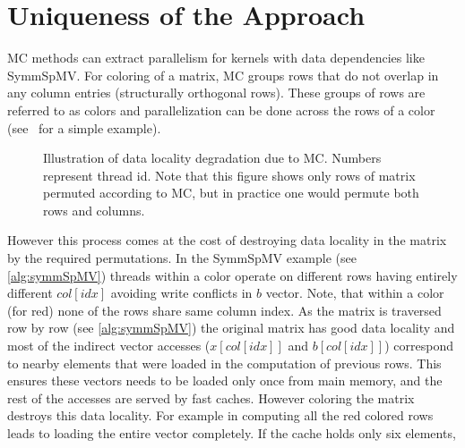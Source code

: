 \section{Uniqueness of the Approach} \label{sec:uniqueness}
\Acrlong{MC} methods can extract parallelism for kernels with data dependencies like \acrshort{SymmSpMV}. 
For \DTWO coloring of a matrix, \acrshort{MC}
groups rows that do not overlap in any column 
entries \cite{dist_k_def} (structurally orthogonal rows). These groups of rows are referred to as colors and parallelization can be done across the rows of a color (see~ for a simple example). 
\begin{figure}[tb]
	\centering
	\hspace{0.5em}
	\caption{\label{fig:mc_problem} Illustration of data locality degradation due to \acrshort{MC}.
		Numbers represent thread id. Note that this figure shows only rows of matrix
		 permuted according to \acrshort{MC}, but in practice one would permute both 
		 rows and columns.}
\end{figure}
However this process comes at the cost of destroying data locality in the matrix by the required permutations. 
In the \acrshort{SymmSpMV} example (see \cref{alg:symmSpMV}) 
threads within a color operate on different rows having entirely different 
$col[idx]$ avoiding write conflicts in $b$ vector. 
Note, that within a color (for \eg red) none of the rows share same column index.
As the matrix is traversed row by row (see \cref{alg:symmSpMV}) the original matrix
has good data locality and most of the indirect vector accesses 
($x[col[idx]]$ and $b[col[idx]]$) correspond to nearby elements 
that were loaded in the computation of previous rows.
This ensures these vectors needs to be loaded only
once from main memory, and the rest of the accesses are served by 
fast caches. However coloring the matrix destroys this data locality. For example
in  computing all the red colored rows leads to loading the 
entire vector completely. If the cache holds only  six elements, 
